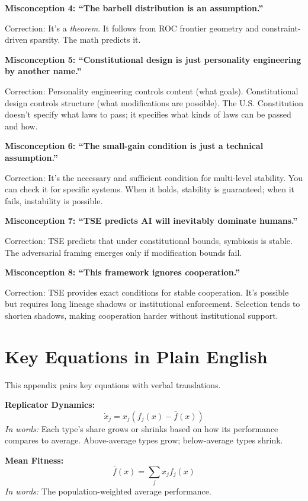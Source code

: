 \documentclass[12pt]{article}
\begin{document}
\textbf{Misconception 4: ``The barbell distribution is an assumption.''}

Correction: It's a \emph{theorem}. It follows from ROC frontier geometry and constraint-driven sparsity. The math predicts it.

\textbf{Misconception 5: ``Constitutional design is just personality engineering by another name.''}

Correction: Personality engineering controls content (what goals). Constitutional design controls structure (what modifications are possible). The U.S. Constitution doesn't specify what laws to pass; it specifies what kinds of laws can be passed and how.

\textbf{Misconception 6: ``The small-gain condition is just a technical assumption.''}

Correction: It's the necessary and sufficient condition for multi-level stability. You can check it for specific systems. When it holds, stability is guaranteed; when it fails, instability is possible.

\textbf{Misconception 7: ``TSE predicts AI will inevitably dominate humans.''}

Correction: TSE predicts that under constitutional bounds, symbiosis is stable. The adversarial framing emerges only if modification bounds fail.

\textbf{Misconception 8: ``This framework ignores cooperation.''}

Correction: TSE provides exact conditions for stable cooperation. It's possible but requires long lineage shadows or institutional enforcement. Selection tends to shorten shadows, making cooperation harder without institutional support.


\section{Key Equations in Plain English}
\label{app:equations}

This appendix pairs key equations with verbal translations.

\textbf{Replicator Dynamics:}
\[
\dot{x}_j = x_j (f_j(x) - \bar{f}(x))
\]
\emph{In words:} Each type's share grows or shrinks based on how its performance compares to average. Above-average types grow; below-average types shrink.

\textbf{Mean Fitness:}
\[
\bar{f}(x) = \sum_j x_j f_j(x)
\]
\emph{In words:} The population-weighted average performance.
\end{document}
